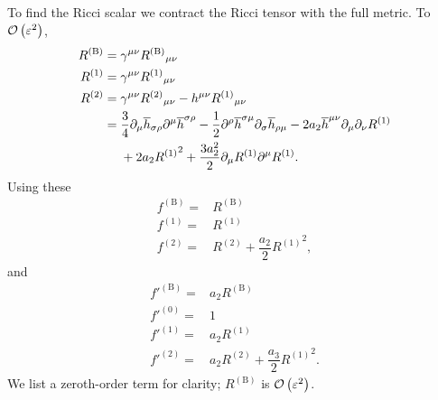To find the Ricci scalar we contract the Ricci tensor with the full metric. To $\mathcal{O}\left({\varepsilon^2}\right)$,
\begin{subequations}
\begin{align}
R^{(\text{B})} = {} & \gamma^{\mu\nu} {R^{(\text{B})}}_{\mu\nu} \\
R^{(1)} = {} & \gamma^{\mu\nu} {R^{(1)}}_{\mu\nu} \\
R^{(2)} = {} & \gamma^{\mu\nu} {R^{(2)}}_{\mu\nu} - h^{\mu\nu} {R^{(1)}}_{\mu\nu} \nonumber \\*
 = {} & \dfrac{3}{4}\partial_\mu\overline{h}_{\sigma\rho}\partial^\mu\overline{h}^{\sigma\rho} - \dfrac{1}{2} \partial^\rho\overline{h}^{\sigma\mu}\partial_\sigma\overline{h}_{\rho\mu} - 2a_2 \overline{h}^{\mu\nu}\partial_\mu\partial_\nu R^{(1)} \nonumber \\*
  & + {} 2 a_2 {R^{(1)}}^2 + \dfrac{3a_2^2}{2}\partial_\mu R^{(1)} \partial^\mu R^{(1)}.
\end{align}
\end{subequations}
Using these
\begin{subequations}
\begin{align}
f^{(\text{B})} = {} & R^{(\text{B})} \\
f^{(1)} = {} & R^{(1)} \\
f^{(2)} = {} & R^{(2)} + \dfrac{a_2}{2}{R^{(1)}}^2,
\end{align}
\end{subequations}
and
\begin{subequations}
\begin{align}
f'^{(\text{B})} = {} & a_2 R^{(\text{B})} \\
f'^{(0)} = {} & 1 \\
f'^{(1)} = {} & a_2 R^{(1)} \\
f'^{(2)} = {} & a_2 R^{(2)} + \dfrac{a_3}{2}{R^{(1)}}^2.
\end{align}
\end{subequations}
We list a zeroth-order term for clarity; $R^{(\text{B})}$ is $\mathcal{O}\left({\varepsilon^2}\right)$.

